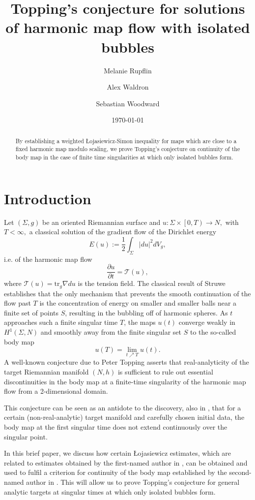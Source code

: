 \documentclass[10pt,reqno]{amsart}
\title{Topping's conjecture for solutions of harmonic map flow with isolated bubbles}
\date{\today}
\author{Melanie Rupflin}
\author{Alex Waldron}
\author{Sebastian Woodward}
\theoremstyle{plain}
\theoremstyle{definition}
\numberwithin{equation}{section}
\newcommand{\Si}{\Sigma}
\newcommand{\T}{{\mathcal T}}
\newcommand{\half}{\frac{1}{2}}
\newcommand{\abs}[1]{\vert#1\vert}
\newcommand{\tr}{\text{tr}}
\newcommand{\Loj}{{\L}ojasiewicz }
\begin{document}
\begin{abstract}
    By establishing a weighted \L ojasiewicz-Simon inequality for maps which are close to a fixed harmonic map modulo scaling, we prove Topping's conjecture on continuity of the body map in the case of finite time singularities at which only isolated bubbles form. 
\end{abstract}



\maketitle


\thispagestyle{empty}



\section{Introduction}


Let $(\Sigma,g)$ be an oriented Riemannian surface and $u : \Sigma \times \left[ 0, T \right) \to N,$ with $T < \infty,$ a classical solution of the gradient flow of the Dirichlet energy $$E(u):=\half \int_\Si \abs{du}^2 dV_g,$$ i.e. of the harmonic map flow
$$\frac{\partial u}{\partial t} = \T(u),$$
where $\T(u) = \tr_g \nabla du$ is the tension field. 
The classical result \cite{struwehmsurfaces} of Struwe establishes that the only mechanism that prevents the smooth continuation of the flow past $T$ is the concentration of energy on smaller and smaller balls near a finite set of points $S$, resulting in the bubbling off of harmonic spheres.
As $t$ approaches such a finite singular time $T$, the maps $u(t)$ converge weakly in $H^1(\Sigma, N)$ and smoothly away from the finite singular set $S$ to the so-called body map
$$u(T) = \lim_{t \nearrow T} u(t).$$
A well-known conjecture due to Peter Topping \cite[p. 286]{toppingwindingbehavior} asserts that real-analyticity of the target Riemannian manifold $(N,h)$ is sufficient to rule out essential discontinuities in the body map at a finite-time singularity of the harmonic map flow from a 2-dimensional domain.

This conjecture can be seen as an antidote to the discovery, also in \cite{toppingwindingbehavior}, that for a certain (non-real-analytic) target manifold and carefully chosen initial data, the body map at the first singular time does not extend continuously over the singular point.

In this brief paper, we discuss how certain \Loj estimates, which are related to 
estimates obtained by the first-named author in \cite{rupflinharmonic}, can be obtained and used to fulfil a criterion for continuity of the body map established by the second-named author in \cite{waldronweighted}. This will allow us to prove Topping's conjecture for general analytic targets at singular times at which only isolated bubbles form. 
\end{document}
